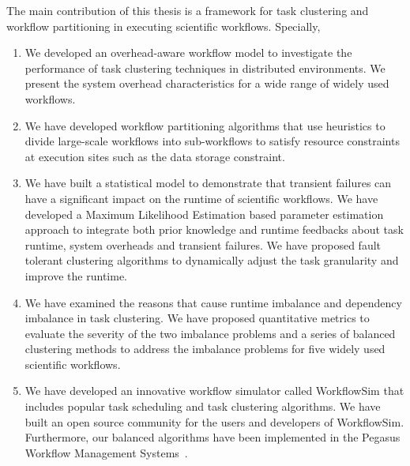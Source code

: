 The main contribution of this thesis is a framework for task clustering and workflow partitioning in executing scientific workflows. Specially, 
\begin{enumerate}
\item We developed an overhead-aware workflow model to investigate the performance of task clustering techniques in distributed environments. We present the system overhead characteristics for a wide range of widely used workflows.
\item We have developed workflow partitioning algorithms that use heuristics to divide large-scale workflows into sub-workflows to satisfy resource constraints at execution sites such as the data storage constraint. 
\item We have built a statistical model to demonstrate that transient failures can have a significant impact on the runtime of scientific workflows. We have developed a Maximum Likelihood Estimation based parameter estimation approach to integrate both prior knowledge and runtime feedbacks about task runtime, system overheads and transient failures. We have proposed fault tolerant clustering algorithms to dynamically adjust the task granularity and improve the runtime. 
\item We have examined the reasons that cause runtime imbalance and dependency imbalance in task clustering. We have proposed quantitative metrics to evaluate the severity of the two imbalance problems and a series of balanced clustering methods to address the imbalance problems for five widely used scientific workflows. 
\item We have developed an innovative workflow simulator called WorkflowSim that includes popular task scheduling and task clustering algorithms. 
We have built an open source community for the users and developers of WorkflowSim. Furthermore, our balanced algorithms have been implemented in the Pegasus Workflow Management Systems~\cite{Deelman2014}. 
\end{enumerate}
 


